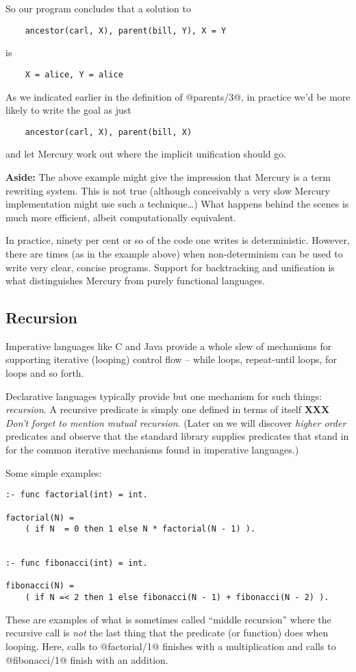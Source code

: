 \documentclass[a4paper,11pt,notitlepage,onecolumn]{article}
\newcommand{\XXX}[1]%
{{\small\textbf{XXX} \emph{#1}}}
\newcommand{\Aside}[1]%
{{\small{\begin{description}\item{\textbf{Aside:}} #1\end{description}}}}
\begin{document}
So our program concludes that a solution to
\begin{verbatim}
    ancestor(carl, X), parent(bill, Y), X = Y
\end{verbatim}
is
\begin{verbatim}
    X = alice, Y = alice
\end{verbatim}
As we indicated earlier in the definition of @parents/3@, in
practice we'd be more likely to write the goal as just
\begin{verbatim}
    ancestor(carl, X), parent(bill, X)
\end{verbatim}
and let Mercury work out where the implicit unification should
go.

\Aside{The above example might give the impression that Mercury is a term
rewriting system.  This is not true (although conceivably a very
slow Mercury implementation might use such a technique\ldots)  What
happens behind the scenes is much more efficient, albeit
computationally equivalent.}

In practice, ninety per cent or so of the code one writes is
deterministic.  However, there are times (as in the example above) when
non-determinism can be used to write very clear, concise programs.
Support for backtracking and unification is what distinguishes Mercury
from purely functional languages.

\subsection{Recursion}

Imperative languages like C and Java provide a whole slew of
mechanisms for supporting iterative (looping) control flow --
while loops, repeat-until loops, for loops and so forth.

Declarative languages typically provide but one mechanism for
such things: \emph{recursion}.  A recursive predicate is simply one
defined in terms of itself \XXX{Don't forget to mention mutual
recursion}.  (Later on we will discover \emph{higher order} predicates
and observe that the standard library supplies predicates that stand in
for the common iterative mechanisms found in imperative languages.)

Some simple examples:
\begin{verbatim}
:- func factorial(int) = int.

factorial(N) =
    ( if N  = 0 then 1 else N * factorial(N - 1) ).


:- func fibonacci(int) = int.

fibonacci(N) =
    ( if N =< 2 then 1 else fibonacci(N - 1) + fibonacci(N - 2) ).
\end{verbatim}
These are examples of what is sometimes called ``middle
recursion'' where the recursive call is \emph{not} the last thing
that the predicate (or function) does when looping.  Here,
calls to @factorial/1@ finishes with a multiplication and calls
to @fibonacci/1@ finish with an addition.
\end{document}
